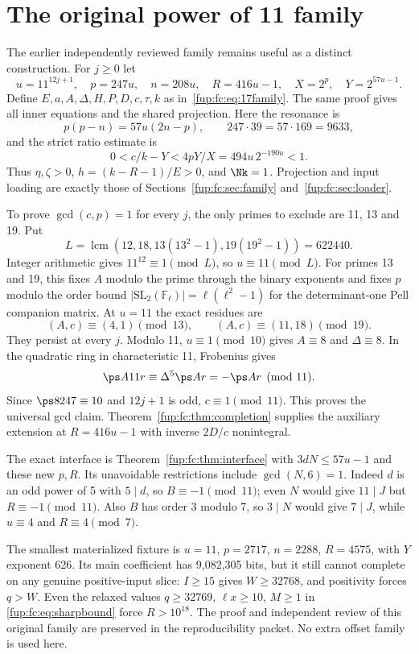 \documentclass[11pt,letterpaper]{article}
\newcommand{\fupR}{0}
\renewcommand{\thesection}{\fupR.\arabic{section}}
\renewcommand{\theHsection}{\fupR.\arabic{section}}
\newcommand{\fupappendix}{%
  \setcounter{section}{0}%
  \renewcommand{\thesection}{\fupR.\Alph{section}}%
  \renewcommand{\theHsection}{\fupR.\Alph{section}}}
\theoremstyle{definition}\newtheorem{definition}[theorem]{Definition}
\theoremstyle{remark}\newtheorem{remark}[theorem]{Remark}
\newcommand{\D}{\Delta}
\begin{document}
\fupappendix
\section{The original power of 11 family}
\label{fup:fc:app:11}
The earlier independently reviewed family remains useful as a distinct
construction. For $j\ge0$ let
\[
 u=11^{12j+1},\quad p=247u,\quad n=208u,\quad R=416u-1,
 \quad X=2^p,\quad Y=2^{57u-1}.
\]
Define $E,a,A,\D,H,P,D,c,\tau,k$ as in~\eqref{fup:fc:eq:17family}.
The same proof gives all inner equations and the shared projection.
Here the resonance is
\[
 p(p-n)=57u(2n-p),\qquad247\cdot39=57\cdot169=9633,
\]
and the strict ratio estimate is
\[
 0<c/k-Y<4pY/X=494u\,2^{-190u}<1.
\]
Thus $\eta,\zeta>0$, $h=(k-R-1)/E>0$, and $\Nk=1$.
Projection and input loading are exactly those of
Sections~\ref{fup:fc:sec:family} and~\ref{fup:fc:sec:loader}.

To prove $\gcd(c,p)=1$ for every $j$, the only primes to exclude are
11, 13 and 19. Put
\[
 L=\operatorname{lcm}(12,18,13(13^2-1),19(19^2-1))=622440.
\]
Integer arithmetic gives $11^{12}\equiv1\pmod L$, so $u\equiv11\pmod L$.
For primes 13 and 19, this fixes $A$ modulo the prime through the binary
exponents and fixes $p$ modulo the order bound
$|\mathrm{SL}_2(\mathbb F_\ell)|=\ell(\ell^2-1)$ for the determinant-one
Pell companion matrix. At $u=11$ the exact residues are
\[
 (A,c)\equiv(4,1)\pmod{13},\qquad(A,c)\equiv(11,18)\pmod{19}.
\]
They persist at every $j$.
Modulo 11, $u\equiv1\pmod{10}$ gives $A\equiv8$ and $\D\equiv8$.
In the quadratic ring in characteristic 11, Frobenius gives
\[
 \ps A{11r}\equiv\D^5\ps A r=-\ps A r\pmod{11}.
\]
Since $\ps8{247}\equiv10$ and $12j+1$ is odd, $c\equiv1\pmod{11}$.
This proves the universal gcd claim. Theorem~\ref{fup:fc:thm:completion} supplies
the auxiliary extension at $R=416u-1$ with inverse $2D/c$ nonintegral.

The exact interface is Theorem~\ref{fup:fc:thm:interface} with
$3dN\le57u-1$ and these new $p,R$. Its unavoidable restrictions include
$\gcd(N,6)=1$. Indeed $d$ is an odd power of 5 with $5\mid d$, so
$B\equiv-1\pmod{11}$; even $N$ would give $11\mid J$ but
$R\equiv-1\pmod{11}$. Also $B$ has order 3 modulo 7, so $3\mid N$
would give $7\mid J$, while $u\equiv4$ and $R\equiv4\pmod7$.

The smallest materialized fixture is $u=11$, $p=2717$, $n=2288$,
$R=4575$, with $Y$ exponent 626. Its main coefficient has 9,082,305
bits, but it still cannot complete on any genuine positive-input slice:
$I\ge15$ gives $W\ge32768$, and positivity forces $q>W$.
Even the relaxed values $q\ge32769$, $\ell x\ge10$, $M\ge1$ in
\eqref{fup:fc:eq:sharpbound} force $R>10^{18}$.
The proof and independent review of this original family are preserved
in the reproducibility packet. No extra offset family is used here.
\end{document}
